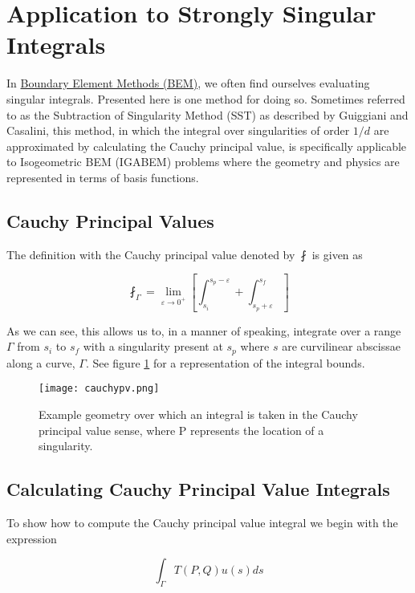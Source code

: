 \section{Application to Strongly Singular Integrals}
In \hyperref[ch:boundaryelementmethod]{Boundary Element Methods (BEM)}, we often find ourselves evaluating singular integrals. Presented here is one method for doing so. Sometimes referred to as the Subtraction of Singularity Method (SST) \label{vocab:subtractionofsingularity} as described by Guiggiani and Casalini,\cite{Guiggiani1987Direct-computat} this method, in which the integral over singularities of order $1/d$ are approximated by calculating the Cauchy principal value, is specifically applicable to Isogeometric BEM (IGABEM) problems where the geometry and physics are represented in terms of basis functions.

\subsection{Cauchy Principal Values}
The definition with the Cauchy principal value denoted by $\fint$ is given as

\begin{equation} \fint_{\Gamma} = \lim_{ \varepsilon \rightarrow 0^+} \left[ \int_{s_i}^{s_p -\varepsilon} + \int_{s_p + \varepsilon}^{s_f}  \right] \end{equation}

As we can see, this allows us to, in a manner of speaking, integrate over a range $\Gamma$ from $s_i$ to $s_f$ with a singularity present at $s_p$ where $s$ are curvilinear abscissae along a curve, $\Gamma$. See figure \ref{fig:cauchypv} for a representation of the integral bounds.

\begin{figure}[htb]
	\centering
	\texttt{[image: cauchypv.png]}
	\caption{Example geometry over which an integral is taken in the Cauchy principal value sense, where P represents the location of a singularity.\cite{Guiggiani1987Direct-computat}}
	\label{fig:cauchypv}
\end{figure}

\subsection{Calculating Cauchy Principal Value Integrals}
To show how to compute the Cauchy principal value integral we begin with the expression

\begin{equation}
\int_{\Gamma} T(P,Q) u(s) ds
\end{equation}

